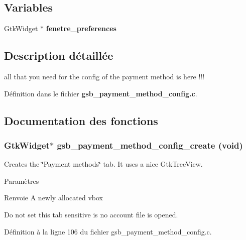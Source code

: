 \subsection*{Variables}
\begin{DoxyCompactItemize}
\item 
GtkWidget $\ast$ {\bf fenetre\_\-preferences}
\end{DoxyCompactItemize}


\subsection{Description détaillée}
all that you need for the config of the payment method is here !!! 

Définition dans le fichier {\bf gsb\_\-payment\_\-method\_\-config.c}.



\subsection{Documentation des fonctions}
\subsubsection[{gsb\_\-payment\_\-method\_\-config\_\-create}]{\setlength{\rightskip}{0pt plus 5cm}GtkWidget$\ast$ gsb\_\-payment\_\-method\_\-config\_\-create (void)}\label{gsb__payment__method__config_8c_ae9065f6711790bf2affea09548462a21}
Creates the \char`\"{}Payment methods\char`\"{} tab. It uses a nice GtkTreeView.


\begin{DoxyParams}{Paramètres}
\item[{\em }]\end{DoxyParams}
\begin{DoxyReturn}{Renvoie}
A newly allocated vbox 
\end{DoxyReturn}


Do not set this tab sensitive is no account file is opened. 



Définition à la ligne 106 du fichier gsb\_\-payment\_\-method\_\-config.c.



